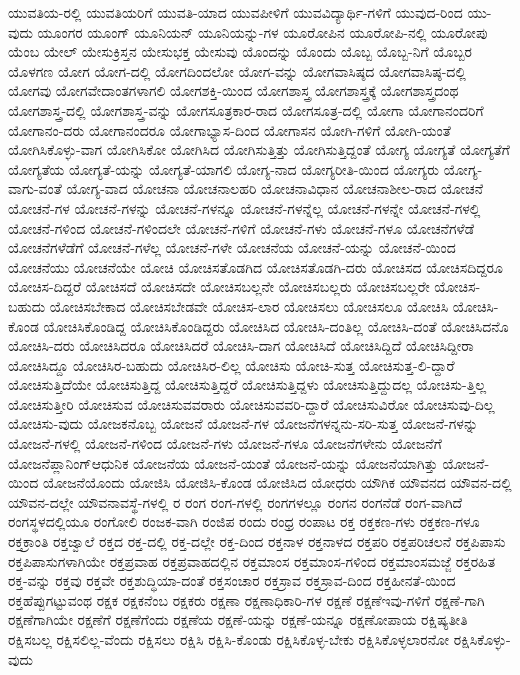 {ಯುವತಿಯ-ರಲ್ಲಿ
ಯುವತಿಯರಿಗೆ
ಯುವತಿ-ಯಾದ
ಯುವಪೀಳಿಗೆ
ಯುವವಿದ್ಯಾರ್ಥಿ-ಗಳಿಗೆ
ಯುವುದ-ರಿಂದ
ಯು-ವುದು
ಯೂಂಗರ
ಯೂಂಗ್
ಯೂನಿಯನ್
ಯೂನಿಯನ್ನು-ಗಳ
ಯೂರೋಪಿನ
ಯೂರೋಪಿ-ನಲ್ಲಿ
ಯೂರೋಪು
ಯೆಂಬ
ಯೇಲ್
ಯೇಸುಕ್ರಿಸ್ತನ
ಯೇಸುಭಕ್ತ
ಯೇಸುವು
ಯೊಂದನ್ನು
ಯೊಂದು
ಯೊಬ್ಬ
ಯೊಬ್ಬ-ನಿಗೆ
ಯೊಬ್ಬರ
ಯೊಳಗಣ
ಯೋಗ
ಯೋಗ-ದಲ್ಲಿ
ಯೋಗದಿಂದಲೋ
ಯೋಗ-ವನ್ನು
ಯೋಗವಾಸಿಷ್ಠದ
ಯೋಗವಾಸಿಷ್ಠ-ದಲ್ಲಿ
ಯೋಗವು
ಯೋಗವೇದಾಂತಗಳಾಗಲಿ
ಯೋಗಶಕ್ತಿ-ಯಿಂದ
ಯೋಗಶಾಸ್ತ್ರ
ಯೋಗಶಾಸ್ತ್ರಕ್ಕೆ
ಯೋಗಶಾಸ್ತ್ರದಂಥ
ಯೋಗಶಾಸ್ತ್ರ-ದಲ್ಲಿ
ಯೋಗಶಾಸ್ತ್ರ-ವನ್ನು
ಯೋಗಸೂತ್ರಕಾರ-ರಾದ
ಯೋಗಸೂತ್ರ-ದಲ್ಲಿ
ಯೋಗಾ
ಯೋಗಾನಂದರಿಗೆ
ಯೋಗಾನಂ-ದರು
ಯೋಗಾನಂದರೂ
ಯೋಗಾಭ್ಯಾಸ-ದಿಂದ
ಯೋಗಾಸನ
ಯೋಗಿ-ಗಳಿಗೆ
ಯೋಗಿ-ಯಂತೆ
ಯೋಗಿಸಿಕೊಳ್ಳು-ವಾಗ
ಯೋಗಿಸಿಕೋ
ಯೋಗಿಸಿದ
ಯೋಗಿಸುತ್ತಿತ್ತು
ಯೋಗಿಸುತ್ತಿದ್ದಂತೆ
ಯೋಗ್ಯ
ಯೋಗ್ಯತೆ
ಯೋಗ್ಯತೆಗೆ
ಯೋಗ್ಯತೆಯ
ಯೋಗ್ಯತೆ-ಯನ್ನು
ಯೋಗ್ಯತೆ-ಯಾಗಲಿ
ಯೋಗ್ಯ-ನಾದ
ಯೋಗ್ಯರೀತಿ-ಯಿಂದ
ಯೋಗ್ಯರು
ಯೋಗ್ಯ-ವಾಗು-ವಂತೆ
ಯೋಗ್ಯ-ವಾದ
ಯೋಚನಾ
ಯೋಚನಾಲಹರಿ
ಯೋಚನಾವಿಧಾನ
ಯೋಚನಾಶೀಲ-ರಾದ
ಯೋಚನೆ
ಯೋಚನೆ-ಗಳ
ಯೋಚನೆ-ಗಳನ್ನು
ಯೋಚನೆ-ಗಳನ್ನೂ
ಯೋಚನೆ-ಗಳನ್ನೆಲ್ಲ
ಯೋಚನೆ-ಗಳನ್ನೇ
ಯೋಚನೆ-ಗಳಲ್ಲಿ
ಯೋಚನೆ-ಗಳಿಂದ
ಯೋಚನೆ-ಗಳಿಂದಲೇ
ಯೋಚನೆ-ಗಳಿಗೆ
ಯೋಚನೆ-ಗಳು
ಯೋಚನೆ-ಗಳೂ
ಯೋಚನೆಗಳೆಡೆ
ಯೋಚನೆಗಳೆಡೆಗೆ
ಯೋಚನೆ-ಗಳೆಲ್ಲ
ಯೋಚನೆ-ಗಳೇ
ಯೋಚನೆಯ
ಯೋಚನೆ-ಯನ್ನು
ಯೋಚನೆ-ಯಿಂದ
ಯೋಚನೆಯು
ಯೋಚನೆಯೇ
ಯೋಚಿ
ಯೋಚಿಸತೊಡಗಿದ
ಯೋಚಿಸತೊಡಗಿ-ದರು
ಯೋಚಿಸದ
ಯೋಚಿಸದಿದ್ದರೂ
ಯೋಚಿಸ-ದಿದ್ದರೆ
ಯೋಚಿಸದೆ
ಯೋಚಿಸದೇ
ಯೋಚಿಸಬಲ್ಲನೇ
ಯೋಚಿಸಬಲ್ಲರು
ಯೋಚಿಸಬಲ್ಲರೇ
ಯೋಚಿಸ-ಬಹುದು
ಯೋಚಿಸಬೇಕಾದ
ಯೋಚಿಸಬೇಡವೇ
ಯೋಚಿಸ-ಲಾರ
ಯೋಚಿಸಲು
ಯೋಚಿಸಲೂ
ಯೋಚಿಸಿ
ಯೋಚಿಸಿ-ಕೊಂಡ
ಯೋಚಿಸಿಕೊಂಡಿದ್ದ
ಯೋಚಿಸಿಕೊಂಡಿದ್ದರು
ಯೋಚಿಸಿದ
ಯೋಚಿಸಿ-ದಂತಿಲ್ಲ
ಯೋಚಿಸಿ-ದಂತೆ
ಯೋಚಿಸಿದನೊ
ಯೋಚಿಸಿ-ದರು
ಯೋಚಿಸಿದರೂ
ಯೋಚಿಸಿದರೆ
ಯೋಚಿಸಿ-ದಾಗ
ಯೋಚಿಸಿದೆ
ಯೋಚಿಸಿದ್ದಿದೆ
ಯೋಚಿಸಿದ್ದೀರಾ
ಯೋಚಿಸಿದ್ದೂ
ಯೋಚಿಸಿರ-ಬಹುದು
ಯೋಚಿಸಿರ-ಲಿಲ್ಲ
ಯೋಚಿಸು
ಯೋಚಿ-ಸುತ್ತ
ಯೋಚಿಸುತ್ತ-ಲಿ-ದ್ದಾರೆ
ಯೋಚಿಸುತ್ತಿದೆಯೇ
ಯೋಚಿಸುತ್ತಿದ್ದ
ಯೋಚಿಸುತ್ತಿದ್ದರೆ
ಯೋಚಿಸುತ್ತಿದ್ದಳು
ಯೋಚಿಸುತ್ತಿದ್ದುದಲ್ಲ
ಯೋಚಿಸು-ತ್ತಿಲ್ಲ
ಯೋಚಿಸುತ್ತೀರಿ
ಯೋಚಿಸುವ
ಯೋಚಿಸುವವರಾರು
ಯೋಚಿಸುವವರಿ-ದ್ದಾರೆ
ಯೋಚಿಸುವಿರೋ
ಯೋಚಿಸುವು-ದಿಲ್ಲ
ಯೋಚಿಸು-ವುದು
ಯೋಜಕನೊಬ್ಬ
ಯೋಜನೆ
ಯೋಜನೆ-ಗಳ
ಯೋಜನೆಗಳನ್ನನು-ಸರಿ-ಸುತ್ತ
ಯೋಜನೆ-ಗಳನ್ನು
ಯೋಜನೆ-ಗಳಲ್ಲಿ
ಯೋಜನೆ-ಗಳಿಂದ
ಯೋಜನೆ-ಗಳು
ಯೋಜನೆ-ಗಳೂ
ಯೋಜನೆಗಳೇನು
ಯೋಜನೆಗೆ
ಯೋಜನೆಪ್ಲಾನಿಂಗ್ಆಧುನಿಕ
ಯೋಜನೆಯ
ಯೋಜನೆ-ಯಂತೆ
ಯೋಜನೆ-ಯನ್ನು
ಯೋಜನೆಯಾಗಿತ್ತು
ಯೋಜನೆ-ಯಿಂದ
ಯೋಜನೆಯೊಂದು
ಯೋಜಿಸಿ
ಯೋಜಿಸಿ-ಕೊಂಡ
ಯೋಜಿಸಿದ
ಯೋಧರು
ಯೌಗಿಕ
ಯೌವನದ
ಯೌವನ-ದಲ್ಲಿ
ಯೌವನ-ದಲ್ಲೇ
ಯೌವನಾವಸ್ಥೆ-ಗಳಲ್ಲಿ
ರ
ರಂಗ
ರಂಗ-ಗಳಲ್ಲಿ
ರಂಗಗಳಲ್ಲೂ
ರಂಗನ
ರಂಗನೆಡೆ
ರಂಗ-ವಾಗಿದೆ
ರಂಗಸ್ಥಳದಲ್ಲಿಯೂ
ರಂಗೋಲಿ
ರಂಜಕ-ವಾಗಿ
ರಂಜಿಪ
ರಂದು
ರಂಧ್ರ
ರಂಪಾಟ
ರಕ್ತ
ರಕ್ತಕಣ-ಗಳು
ರಕ್ತಕಣ-ಗಳೂ
ರಕ್ತಕ್ರಾಂತಿ
ರಕ್ತಜ್ವಾಲೆ
ರಕ್ತದ
ರಕ್ತ-ದಲ್ಲಿ
ರಕ್ತ-ದಲ್ಲೇ
ರಕ್ತ-ದಿಂದ
ರಕ್ತನಾಳ
ರಕ್ತನಾಳದ
ರಕ್ತಪರಿ
ರಕ್ತಪರಿಚಲನೆ
ರಕ್ತಪಿಪಾಸು
ರಕ್ತಪಿಪಾಸುಗಳಾಗಿಯೇ
ರಕ್ತಪ್ರವಾಹ
ರಕ್ತಪ್ರವಾಹದಲ್ಲಿನ
ರಕ್ತಮಾಂಸ
ರಕ್ತಮಾಂಸ-ಗಳಿಂದ
ರಕ್ತಮಾಂಸಮಜ್ಜೆ
ರಕ್ತರಹಿತ
ರಕ್ತ-ವನ್ನು
ರಕ್ತವು
ರಕ್ತವೇ
ರಕ್ತಶುದ್ಧಿಯಾ-ದಂತೆ
ರಕ್ತಸಂಚಾರ
ರಕ್ತಸ್ರಾವ
ರಕ್ತಸ್ರಾವ-ದಿಂದ
ರಕ್ತಹೀನತೆ-ಯಿಂದ
ರಕ್ತಹೆಪ್ಪುಗಟ್ಟುವಂಥ
ರಕ್ಷಕ
ರಕ್ಷಕನೆಂಬ
ರಕ್ಷಕರು
ರಕ್ಷಣಾ
ರಕ್ಷಣಾಧಿಕಾರಿ-ಗಳ
ರಕ್ಷಣೆ
ರಕ್ಷಣೆಇವು-ಗಳಿಗೆ
ರಕ್ಷಣೆ-ಗಾಗಿ
ರಕ್ಷಣೆಗಾಗಿಯೇ
ರಕ್ಷಣೆಗೆ
ರಕ್ಷಣೆಗೆಂದು
ರಕ್ಷಣೆಯ
ರಕ್ಷಣೆ-ಯನ್ನು
ರಕ್ಷಣೆ-ಯನ್ನೂ
ರಕ್ಷಣೋಪಾಯ
ರಕ್ಷಿಷ್ಯತೀತಿ
ರಕ್ಷಿಸಬಲ್ಲ
ರಕ್ಷಿಸಲಿಲ್ಲ-ವೆಂದು
ರಕ್ಷಿಸಲು
ರಕ್ಷಿಸಿ
ರಕ್ಷಿಸಿ-ಕೊಂಡು
ರಕ್ಷಿಸಿಕೊಳ್ಳ-ಬೇಕು
ರಕ್ಷಿಸಿಕೊಳ್ಳಲಾರನೋ
ರಕ್ಷಿಸಿಕೊಳ್ಳು-ವುದು
}
